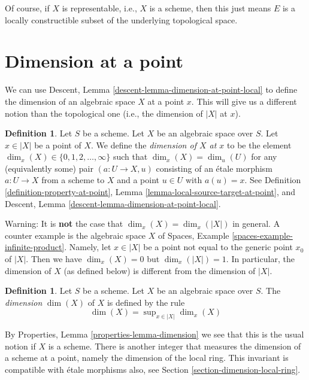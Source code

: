 \documentclass{stacks-project}
\theoremstyle{plain}
\theoremstyle{definition}
\newtheorem{definition}[subsection]{Definition}
\theoremstyle{remark}
\numberwithin{equation}{subsection}
\begin{document}
\noindent
Of course, if $X$ is representable, i.e., $X$ is a scheme,
then this just means $E$ is a locally constructible subset
of the underlying topological space.







\section{Dimension at a point}
\label{section-dimension}

\noindent
We can use
Descent, Lemma \ref{descent-lemma-dimension-at-point-local}
to define the dimension of an algebraic
space $X$ at a point $x$. This will give us a different notion than the
topological one (i.e., the dimension of $|X|$ at $x$).

\begin{definition}
\label{definition-dimension-at-point}
Let $S$ be a scheme.
Let $X$ be an algebraic space over $S$.
Let $x \in |X|$ be a point of $X$.
We define the {\it dimension of $X$ at $x$} to be
the element $\dim_x(X) \in \{0, 1, 2, \ldots, \infty\}$
such that $\dim_x(X) = \dim_u(U)$ for any (equivalently some)
pair $(a : U \to X, u)$ consisting of an \'etale morphism $a : U \to X$
from a scheme to $X$ and a point $u \in U$ with $a(u) = x$.
See
Definition \ref{definition-property-at-point},
Lemma \ref{lemma-local-source-target-at-point}, and
Descent, Lemma \ref{descent-lemma-dimension-at-point-local}.
\end{definition}

\noindent
Warning: It is {\bf not} the case that $\dim_x(X) = \dim_x(|X|)$
in general. A counter example is the algebraic space $X$ of
Spaces, Example \ref{spaces-example-infinite-product}.
Namely, let $x \in |X|$ be a point not equal to the generic point $x_0$
of $|X|$. Then we have $\dim_x(X) = 0$ but $\dim_x(|X|) = 1$.
In particular, the dimension of $X$ (as defined
below) is different from the dimension of $|X|$.

\begin{definition}
\label{definition-dimension}
Let $S$ be a scheme. Let $X$ be an algebraic space over $S$.
The {\it dimension} $\dim(X)$ of $X$ is defined by the rule
$$
\dim(X) = \sup\nolimits_{x \in |X|} \dim_x(X)
$$
\end{definition}

\noindent
By
Properties, Lemma \ref{properties-lemma-dimension}
we see that this is the usual notion if $X$ is a scheme.
There is another integer that measures the dimension of a scheme
at a point, namely the dimension of the local ring. This invariant
is compatible with \'etale morphisms also, see
Section \ref{section-dimension-local-ring}.
\end{document}
